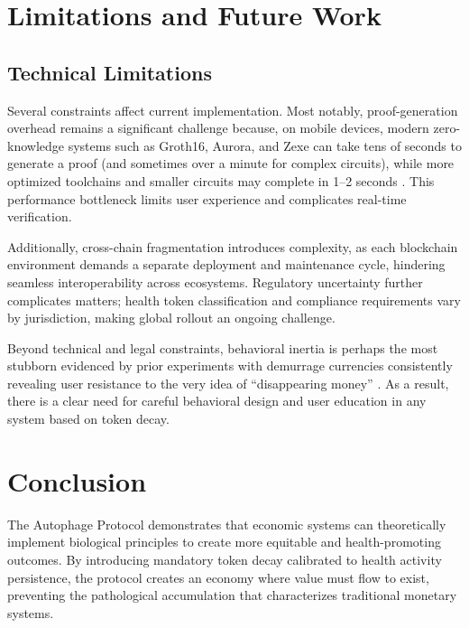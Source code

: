 \documentclass[11pt,letterpaper]{article}
\begin{document}
\section{Limitations and Future Work}

\subsection{Technical Limitations}

Several constraints affect current implementation. Most notably, proof-generation overhead remains a significant challenge because, on mobile devices, modern zero-knowledge systems  such as Groth16, Aurora, and Zexe \cite{groth2016size,ben2019aurora,bowe2017zexe} can take tens of seconds to generate a proof (and sometimes over a minute for complex circuits), while more optimized toolchains and smaller circuits may complete in 1–2 seconds \cite{vacp2p2021zkp}. This performance bottleneck limits user experience and complicates real-time verification.

Additionally, cross-chain fragmentation introduces complexity, as each blockchain environment demands a separate deployment and maintenance cycle, hindering seamless interoperability across ecosystems. Regulatory uncertainty further complicates matters; health token classification and compliance requirements vary by jurisdiction, making global rollout an ongoing challenge.

Beyond technical and legal constraints, behavioral inertia is perhaps the most stubborn evidenced by prior experiments with demurrage currencies consistently revealing user resistance to the very idea of ``disappearing money'' \cite{gesell1958natural,freicoin2013project}. As a result, there is a clear need for careful behavioral design and user education in any system based on token decay.

\section{Conclusion}

The Autophage Protocol demonstrates that economic systems can theoretically implement biological principles to create more equitable and health-promoting outcomes. By introducing mandatory token decay calibrated to health activity persistence, the protocol creates an economy where value must flow to exist, preventing the pathological accumulation that characterizes traditional monetary systems.
\end{document}
